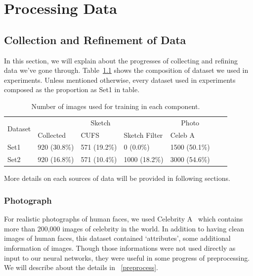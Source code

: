 \chapter{Processing Data}\label{Ch:process_data}


\section{Collection and Refinement of Data}
In this section, we will explain about the progresses of collecting and refining data we've gone through. 
Table~\ref{TABLE:composition} shows the composition of dataset we used in experiments. Unless mentioned otherwise, every dataset used in experiments composed as the proportion as Set1 in table.

\begin{table}[h]
    \begin{center}
        \begin{tabular}{|l|l|l|l|l|l|l|}
          \hline
          \multirow{2}{*}{Dataset} &
            \multicolumn{3}{c}{Sketch} &
            \multicolumn{1}{c|}{Photo}\\
          & Collected & CUFS & Sketch Filter & Celeb A\\
          \hline
          Set1 & 920 (30.8\%) & 571 (19.2\%) & 0 (0.0\%) & 1500 (50.1\%) \\
          \hline
          Set2 & 920 (16.8\%) & 571 (10.4\%) & 1000 (18.2\%) & 3000 (54.6\%) \\
          \hline
        \end{tabular}
    \end{center}
    \caption{Number of images used for training in each component.}\label{TABLE:composition}
\end{table}

More details on each sources of data will be provided in following sections.

\subsection{Photograph}

For realistic photographs of human faces, we used Celebrity A~\cite{liu2015faceattributes} which contains more than 200,000 images of celebrity in the world. In addition to having clean images of human faces, this dataset contained `attributes', some additional imformation of images. Though those informations were not used directly as input to our neural networks, they were useful in some progress of preprocessing. We will describe about the details in ~\ref{preprocess}.


